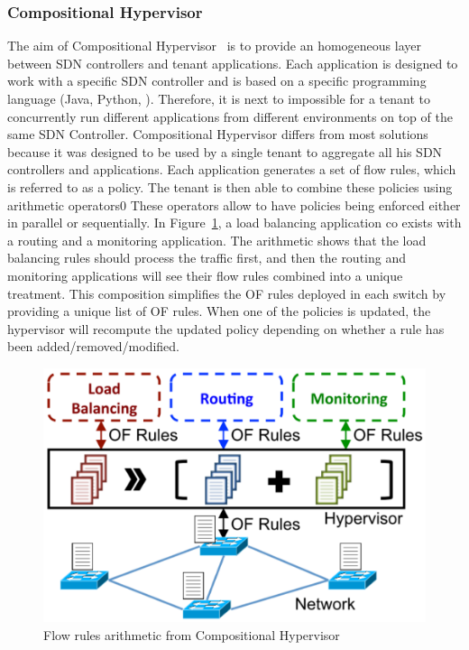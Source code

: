 \subsubsection{Compositional Hypervisor}
The aim of Compositional Hypervisor~\cite{CompositionalHypervisor-Jin2014} is to provide an homogeneous layer between SDN controllers and tenant applications.
Each application is designed to work with a specific SDN controller and is based on a specific programming language (Java, Python, \etc). Therefore, it is next to impossible for a tenant to concurrently run different applications from different environments on top of the same SDN Controller.
Compositional Hypervisor differs from most solutions because it was designed to be used by a single tenant to aggregate all his SDN controllers and applications.
Each application generates a set of flow rules, which is referred to as a policy.
The tenant is then able to combine these policies using arithmetic operators0
These operators allow to have policies being enforced either in parallel or sequentially. 
In Figure~\ref{fig:compositional-hyp}, a load balancing application co exists with a routing and a monitoring application. The arithmetic shows that the load balancing rules should process the traffic first, and then the routing and monitoring applications will see their flow rules combined into a unique treatment.
This composition simplifies the OF rules deployed in each switch by providing a unique list of OF rules. When one of the policies is updated, the hypervisor will recompute the updated policy depending on whether a rule has been added/removed/modified.

\begin{figure}[ht]
    \centering
    \includegraphics[scale=0.7]{figures/compositional-structure.pdf}
    \caption{Flow rules arithmetic from Compositional Hypervisor~\cite{CompositionalHypervisor-Jin2014}}
    \label{fig:compositional-hyp}
\end{figure}


